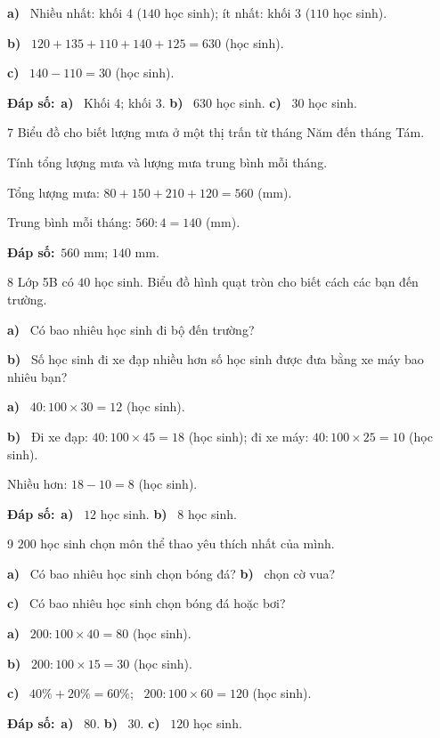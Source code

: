 \documentclass[11pt]{article}
\newif\ifsol \solfalse
\providecommand{\AnsWord}{Đáp số}
\newcommand{\dapso}[1]{\par\textbf{\AnsWord:}\ #1}
\newcommand{\probsol}[1]{%
  \begin{lrbox}{\solmeasure}\begin{minipage}{\dimexpr\linewidth-24pt\relax}#1\end{minipage}\end{lrbox}%
  \ifsol
    \begin{solbox}#1\end{solbox}%
  \else
    \setlength{\solht}{\dimexpr\ht\solmeasure+\dp\solmeasure+0.85cm\relax}%
    \ifdim\solht<1.35cm\setlength{\solht}{1.35cm}\fi
    \begin{tcolorbox}[colback=white,colframe=Line,boxrule=0.8pt,arc=5pt,
      left=8pt,right=8pt,top=4pt,bottom=4pt,height=\solht]{\footnotesize\color{Slate}\itshape\WorkWord}\end{tcolorbox}%
  \fi}
\newcommand{\pa}[1]{\textbf{#1)}\ }
\newcommand{\gap}{\vspace{0.3cm}}
\def\WorkWord{Bài làm:}
\def\AnsWord{Đáp số}
\begin{document}
\probsol{
\pa{a} Nhiều nhất: khối 4 ($140$ học sinh); ít nhất: khối 3 ($110$ học sinh).\par
\pa{b} $120+135+110+140+125=630$ (học sinh).\par
\pa{c} $140-110=30$ (học sinh).
\dapso{\pa{a} Khối 4; khối 3. \pa{b} $630$ học sinh. \pa{c} $30$ học sinh.}}
\gap
\needspace{8.5cm}
\begin{probbox}{7}{\relax}
Biểu đồ cho biết lượng mưa ở một thị trấn từ tháng Năm đến tháng Tám.
\begin{center}
\end{center}
Tính tổng lượng mưa và lượng mưa trung bình mỗi tháng.
\end{probbox}
\probsol{
Tổng lượng mưa: $80+150+210+120=560$ (mm).\par Trung bình mỗi tháng: $560:4=140$ (mm).
\dapso{$560$ mm; $140$ mm.}}
\gap
\needspace{7.5cm}
\begin{probbox}{8}{\relax}
Lớp 5B có $40$ học sinh. Biểu đồ hình quạt tròn cho biết cách các bạn đến trường.
\begin{center}
\end{center}
\pa{a} Có bao nhiêu học sinh đi bộ đến trường?\par
\pa{b} Số học sinh đi xe đạp nhiều hơn số học sinh được đưa bằng xe máy bao nhiêu bạn?
\end{probbox}
\probsol{
\pa{a} $40:100\times30=12$ (học sinh).\par
\pa{b} Đi xe đạp: $40:100\times45=18$ (học sinh); đi xe máy: $40:100\times25=10$ (học sinh).\par Nhiều hơn: $18-10=8$ (học sinh).
\dapso{\pa{a} $12$ học sinh. \pa{b} $8$ học sinh.}}
\gap
\needspace{7.5cm}
\begin{probbox}{9}{\relax}
$200$ học sinh chọn môn thể thao yêu thích nhất của mình.
\begin{center}
\end{center}
\pa{a} Có bao nhiêu học sinh chọn bóng đá? \quad \pa{b} chọn cờ vua?\par
\pa{c} Có bao nhiêu học sinh chọn bóng đá hoặc bơi?
\end{probbox}
\probsol{
\pa{a} $200:100\times40=80$ (học sinh).\par
\pa{b} $200:100\times15=30$ (học sinh).\par
\pa{c} $40\%+20\%=60\%$; \ $200:100\times60=120$ (học sinh).
\dapso{\pa{a} $80$. \pa{b} $30$. \pa{c} $120$ học sinh.}}
\end{document}
